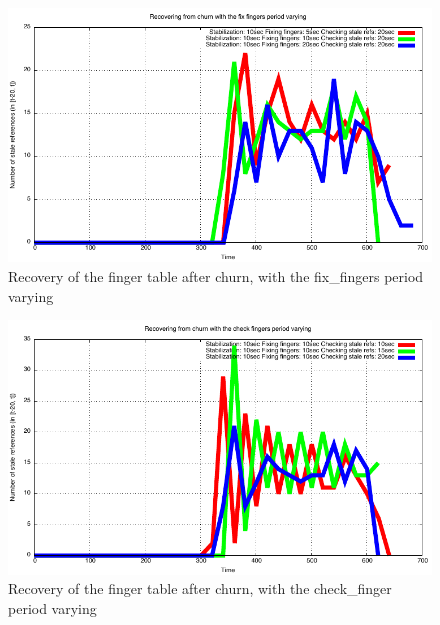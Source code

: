 \documentclass[a4paper, 11pt]{article}
\theoremstyle{plain}
\theoremstyle{definition}
\begin{document}
    
    \begin{figure}[h]
      \centering
      \includegraphics{plots/Recovery-SR-fix-fingers.pdf}
      \caption{Recovery of the finger table after churn, with the fix\_fingers period varying}
      \label{fig:Rec-SR-fix-fingers}
    \end{figure}
    
    
    \begin{figure}[h]
      \centering
      \includegraphics{plots/Recovery-SR-check-fingers.pdf}
      \caption{Recovery of the finger table after churn, with the check\_finger period varying}
      \label{fig:Rec-SR-check-finger}
    \end{figure}



    
    
    












	
\end{document}
